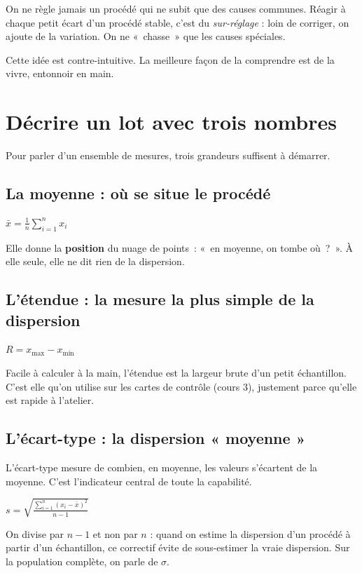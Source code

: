 \documentclass[11pt]{article}
\begin{document}
\begin{cle}[La règle d'or]
On ne règle jamais un procédé qui ne subit que des causes communes. Réagir à chaque petit écart d'un procédé stable, c'est du \emph{sur-réglage} : loin de corriger, on ajoute de la variation. On ne «~chasse~» que les causes spéciales.
\end{cle}

Cette idée est contre-intuitive. La meilleure façon de la comprendre est de la vivre, entonnoir en main.


\section{Décrire un lot avec trois nombres}

Pour parler d'un ensemble de mesures, trois grandeurs suffisent à démarrer.

\subsection{La moyenne : où se situe le procédé}
\begin{formulebox}
$\displaystyle \bar{x} = \frac{1}{n}\sum_{i=1}^{n} x_i$
\end{formulebox}
Elle donne la \textbf{position} du nuage de points~: «~en moyenne, on tombe où~?~». À elle seule, elle ne dit rien de la dispersion.

\subsection{L'étendue : la mesure la plus simple de la dispersion}
\begin{formulebox}
$\displaystyle R = x_{\max} - x_{\min}$
\end{formulebox}
Facile à calculer à la main, l'étendue est la largeur brute d'un petit échantillon. C'est elle qu'on utilise sur les cartes de contrôle (cours 3), justement parce qu'elle est rapide à l'atelier.

\subsection{L'écart-type : la dispersion « moyenne »}
L'écart-type mesure de combien, en moyenne, les valeurs s'écartent de la moyenne. C'est l'indicateur central de toute la capabilité.
\begin{formulebox}
$\displaystyle s = \sqrt{\frac{\sum_{i=1}^{n}(x_i-\bar{x})^2}{n-1}}$
\end{formulebox}
On divise par $n-1$ et non par $n$ : quand on estime la dispersion d'un procédé à partir d'un échantillon, ce correctif évite de sous-estimer la vraie dispersion. Sur la population complète, on parle de $\sigma$.
\end{document}
